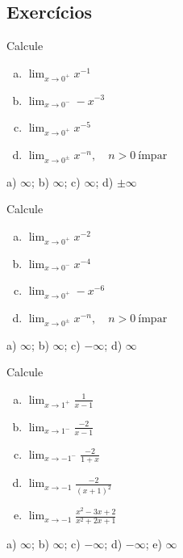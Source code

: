 \subsection{Exercícios}

\begin{exer}
  Calcule
  \begin{enumerate}[a)]
  \item $\displaystyle\lim_{x\to 0^+}x^{-1}$
  \item $\displaystyle\lim_{x\to 0^-}-x^{-3}$
  \item $\displaystyle\lim_{x\to 0^+}x^{-5}$
  \item $\displaystyle\lim_{x\to 0^\pm}x^{-n},\quad n>0 ~\text{ímpar}$
  \end{enumerate}
\end{exer}
\begin{resp}
  a) $\infty$; b) $\infty$; c) $\infty$; d) $\pm\infty$
\end{resp}

\begin{exer}
  Calcule
  \begin{enumerate}[a)]
  \item $\displaystyle\lim_{x\to 0^+}x^{-2}$
  \item $\displaystyle\lim_{x\to 0^-}x^{-4}$
  \item $\displaystyle\lim_{x\to 0^+}-x^{-6}$
  \item $\displaystyle\lim_{x\to 0^\pm}x^{-n},\quad n>0 ~\text{ímpar}$
  \end{enumerate}
\end{exer}
\begin{resp}
  a) $\infty$; b) $\infty$; c) $-\infty$; d) $\infty$
\end{resp}

\begin{exer}
  Calcule
  \begin{enumerate}[a)]
  \item $\displaystyle\lim_{x\to 1^+}\frac{1}{x-1}$
  \item $\displaystyle\lim_{x\to 1^-}\frac{-2}{x-1}$
  \item $\displaystyle\lim_{x\to -1^-}\frac{-2}{1+x}$
  \item $\displaystyle\lim_{x\to -1}\frac{-2}{(x+1)^2}$
  \item $\displaystyle\lim_{x\to -1} \frac{x^2 - 3x + 2}{x^2 + 2x + 1}$
  \end{enumerate}
\end{exer}
\begin{resp}
  a) $\infty$; b) $\infty$; c) $-\infty$; d) $-\infty$; e) $\infty$
\end{resp}

